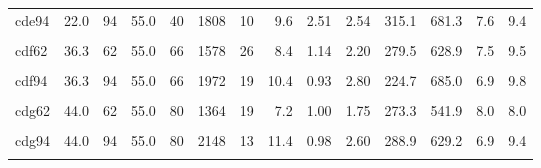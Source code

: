 \begin{landscape}
\begin{longtable}[t]{lrrrrrrrrrrrrr}
cde94 & 22.0 & 94 & 55.0 & 40 & 1808 & 10 & 9.6 & 2.51 & 2.54 & 315.1 & 681.3 & 7.6 & 9.4\\
\cellcolor{gray!6}{cdf46} & \cellcolor{gray!6}{36.3} & \cellcolor{gray!6}{46} & \cellcolor{gray!6}{55.0} & \cellcolor{gray!6}{66} & \cellcolor{gray!6}{2284} & \cellcolor{gray!6}{27} & \cellcolor{gray!6}{12.1} & \cellcolor{gray!6}{1.11} & \cellcolor{gray!6}{2.68} & \cellcolor{gray!6}{351.1} & \cellcolor{gray!6}{694.9} & \cellcolor{gray!6}{8.0} & \cellcolor{gray!6}{9.8}\\
cdf62 & 36.3 & 62 & 55.0 & 66 & 1578 & 26 & 8.4 & 1.14 & 2.20 & 279.5 & 628.9 & 7.5 & 9.5\\
\cellcolor{gray!6}{cdf78} & \cellcolor{gray!6}{36.3} & \cellcolor{gray!6}{78} & \cellcolor{gray!6}{55.0} & \cellcolor{gray!6}{66} & \cellcolor{gray!6}{1624} & \cellcolor{gray!6}{10} & \cellcolor{gray!6}{8.6} & \cellcolor{gray!6}{0.99} & \cellcolor{gray!6}{2.75} & \cellcolor{gray!6}{313.4} & \cellcolor{gray!6}{623.5} & \cellcolor{gray!6}{7.1} & \cellcolor{gray!6}{8.7}\\
cdf94 & 36.3 & 94 & 55.0 & 66 & 1972 & 19 & 10.4 & 0.93 & 2.80 & 224.7 & 685.0 & 6.9 & 9.8\\
\cellcolor{gray!6}{cdg46} & \cellcolor{gray!6}{44.0} & \cellcolor{gray!6}{46} & \cellcolor{gray!6}{55.0} & \cellcolor{gray!6}{80} & \cellcolor{gray!6}{2139} & \cellcolor{gray!6}{19} & \cellcolor{gray!6}{11.3} & \cellcolor{gray!6}{1.20} & \cellcolor{gray!6}{1.98} & \cellcolor{gray!6}{373.7} & \cellcolor{gray!6}{524.6} & \cellcolor{gray!6}{8.7} & \cellcolor{gray!6}{12.4}\\
cdg62 & 44.0 & 62 & 55.0 & 80 & 1364 & 19 & 7.2 & 1.00 & 1.75 & 273.3 & 541.9 & 8.0 & 8.0\\
\cellcolor{gray!6}{cdg78} & \cellcolor{gray!6}{44.0} & \cellcolor{gray!6}{78} & \cellcolor{gray!6}{55.0} & \cellcolor{gray!6}{80} & \cellcolor{gray!6}{1600} & \cellcolor{gray!6}{15} & \cellcolor{gray!6}{8.5} & \cellcolor{gray!6}{1.01} & \cellcolor{gray!6}{2.19} & \cellcolor{gray!6}{298.6} & \cellcolor{gray!6}{645.6} & \cellcolor{gray!6}{7.6} & \cellcolor{gray!6}{10.1}\\
cdg94 & 44.0 & 94 & 55.0 & 80 & 2148 & 13 & 11.4 & 0.98 & 2.60 & 288.9 & 629.2 & 6.9 & 9.4\\
\cellcolor{gray!6}{cdh46} & \cellcolor{gray!6}{55.0} & \cellcolor{gray!6}{46} & \cellcolor{gray!6}{55.0} & \cellcolor{gray!6}{100} & \cellcolor{gray!6}{973} & \cellcolor{gray!6}{9} & \cellcolor{gray!6}{5.2} & \cellcolor{gray!6}{0.97} & \cellcolor{gray!6}{1.59} & \cellcolor{gray!6}{376.1} & \cellcolor{gray!6}{383.6} & \cellcolor{gray!6}{9.2} & \cellcolor{gray!6}{11.0}\\

\end{longtable}
\end{landscape}
